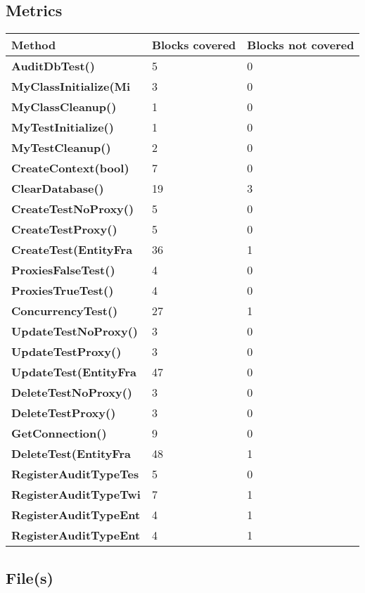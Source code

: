 \documentclass[a4paper,10pt]{article}
\begin{document}
\subsection{Metrics}
\begin{longtable}[l]{|l|l|l|}
\hline
\textbf{Method} & \textbf{Blocks covered} & \textbf{Blocks not covered}\\
\hline
\textbf{AuditDbTest()} & 5 & 0\\
\hline
\textbf{MyClassInitialize(Mi} & 3 & 0\\
\hline
\textbf{MyClassCleanup()} & 1 & 0\\
\hline
\textbf{MyTestInitialize()} & 1 & 0\\
\hline
\textbf{MyTestCleanup()} & 2 & 0\\
\hline
\textbf{CreateContext(bool)} & 7 & 0\\
\hline
\textbf{ClearDatabase()} & 19 & 3\\
\hline
\textbf{CreateTestNoProxy()} & 5 & 0\\
\hline
\textbf{CreateTestProxy()} & 5 & 0\\
\hline
\textbf{CreateTest(EntityFra} & 36 & 1\\
\hline
\textbf{ProxiesFalseTest()} & 4 & 0\\
\hline
\textbf{ProxiesTrueTest()} & 4 & 0\\
\hline
\textbf{ConcurrencyTest()} & 27 & 1\\
\hline
\textbf{UpdateTestNoProxy()} & 3 & 0\\
\hline
\textbf{UpdateTestProxy()} & 3 & 0\\
\hline
\textbf{UpdateTest(EntityFra} & 47 & 0\\
\hline
\textbf{DeleteTestNoProxy()} & 3 & 0\\
\hline
\textbf{DeleteTestProxy()} & 3 & 0\\
\hline
\textbf{GetConnection()} & 9 & 0\\
\hline
\textbf{DeleteTest(EntityFra} & 48 & 1\\
\hline
\textbf{RegisterAuditTypeTes} & 5 & 0\\
\hline
\textbf{RegisterAuditTypeTwi} & 7 & 1\\
\hline
\textbf{RegisterAuditTypeEnt} & 4 & 1\\
\hline
\textbf{RegisterAuditTypeEnt} & 4 & 1\\
\hline
\end{longtable}
\subsection{File(s)}
\end{document}
